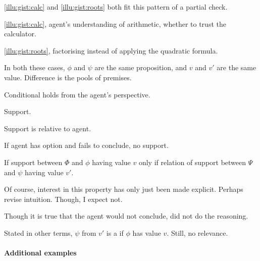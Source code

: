 \begin{note}
   \ref{illu:gist:calc} and \ref{illu:gist:roots} both fit this pattern of a partial check.

  \autoref{illu:gist:calc}, agent's understanding of arithmetic, whether to trust the calculator.

  \autoref{illu:gist:roots}, factorising instead of applying the quadratic formula.

  In both these cases, \(\phi\) and \(\psi\) are the same proposition, and \(v\) and \(v'\) are the same value.
  Difference is the pools of premises.
\end{note}

\begin{note}

\end{note}

\begin{note}
  Conditional holds from the agent's perspective.

  Support.

  Support is relative to agent.

  \begin{idea}
    If agent has option and fails to conclude, no support.
  \end{idea}

  \begin{idea}
    If support between \(\Phi\) and \(\phi\) having value \(v\) only if relation of support between \(\Psi\) and \(\psi\) having value \(v'\).
  \end{idea}
\end{note}

\begin{note}
  Of course, interest in this property has only just been made explicit.
  Perhaps revise intuition.
  Though, I expect not.

  Though it is true that the agent would not conclude, did not do the reasoning.

  Stated in other terms, \(\psi\) from \(v'\) is a \fc{} if \(\phi\) has value \(v\).
  Still, no relevance.
\end{note}

\paragraph{Additional examples}

